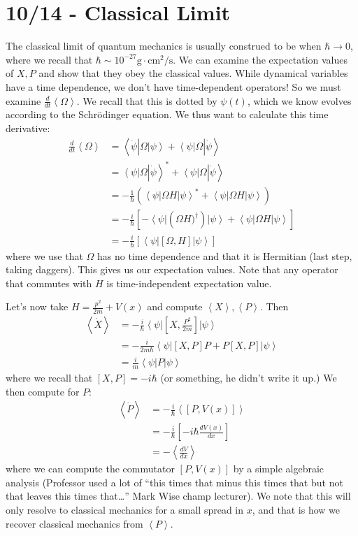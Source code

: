 \documentclass[10pt]{report}
\newcommand{\bra}[1]{\left<#1\right|}
\newcommand{\ket}[1]{\left|#1\right>}
\newcommand{\rd}[2]{\frac{d#1}{d#2}}
\newcommand{\expvalue}[1]{\left<#1\right>}
\begin{document}
\chapter{10/14 - Classical Limit}

The classical limit of quantum mechanics is usually construed to be when $\hbar \to 0$, where we recall that $\hbar \sim 10^{-27} \mathrm{g\cdot cm^2/s}$. We can examine the expectation values of $X,P$ and show that they obey the classical values. While dynamical variables have a time dependence, we don't have time-dependent operators! So we must examine $\rd{}{t} \expvalue{\Omega}$. We recall that this is dotted by $\psi(t)$, which we know evolves according to the Schr\"odinger equation. We thus want to calculate this time derivative:
\begin{align}
	\rd{}{t}\expvalue{\Omega} &= \bra{\dot{\psi}}\Omega\ket{\psi} + \bra{\psi}\Omega\ket{\dot{\psi}}\\
	&=\bra{\psi}\Omega\ket{\dot{\psi}}^* + \bra{\psi}\Omega\ket{\dot{\psi}}\\
	&=-\frac{1}{\hbar}\left(\bra{\psi}\Omega H\ket{\psi}^* + \bra{\psi}\Omega H\ket{\psi}\right)\\
	&=-\frac{i}{\hbar}\left[ -\bra{\psi}\left( \Omega H)^\dagger \right)\ket{\psi} + \bra{\psi}\Omega H \ket{\psi}\right]\\
	&=-\frac{i}{\hbar}\left[ \bra{\psi} \left[ \Omega,H \right]\ket{\psi} \right]
\end{align}
where we use that $\Omega$ has no time dependence and that it is Hermitian (last step, taking daggers). This gives us our expectation values. Note that any operator that commutes with $H$ is time-independent expectation value.

Let's now take $H=\frac{p^2}{2m} + V(x)$ and compute $\expvalue{X},\expvalue{P}$. Then
\begin{align}
	\expvalue{\dot{X}} &= -\frac{i}{\hbar}\bra{\psi}\left[ X,\frac{P^2}{2m} \right]\ket{\psi}\\
	&=-\frac{i}{2m\hbar}\bra{\psi}\left[ X,P \right]P + P\left[ X,P \right]\ket{\psi}\\
	&= \frac{i}{m}\bra{\psi}P\ket{\psi}
\end{align}
where we recall that $\left[ X,P \right] = -i\hbar$ (or something, he didn't write it up.) We then compute for $P$:
\begin{align}
	\expvalue{\dot{P}} &= -\frac{i}{\hbar}\expvalue{\left[ P,V(x) \right]}\\
	&= -\frac{i}{\hbar}\left[ -i\hbar\rd{V(x)}{x} \right]\\
	&= -\expvalue{\rd{V}{x}}
\end{align}
where we can compute the commutator $\left[ P,V(x) \right]$ by a simple algebraic analysis (Professor used a lot of ``this times that minus this times that but not that leaves this times that\dots'' Mark Wise champ lecturer). We note that this will only resolve to classical mechanics for a small spread in $x$, and that is how we recover classical mechanics from $\expvalue{P}$.
\end{document}
